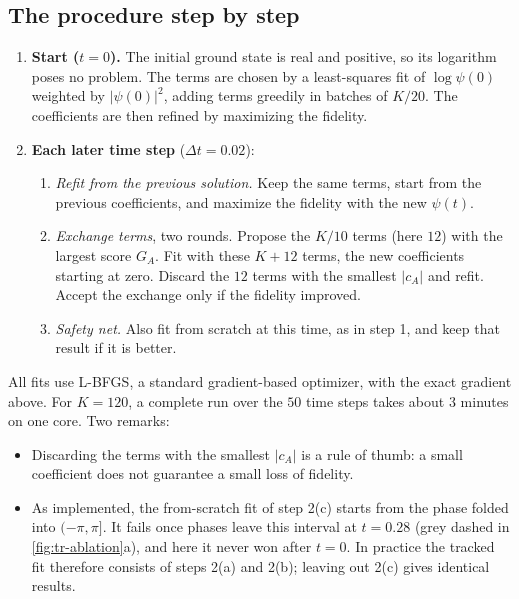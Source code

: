 \documentclass[11pt,a4paper]{article}
\begin{document}
\subsection{The procedure step by step}
\begin{enumerate}
  \item \textbf{Start ($t=0$).} The initial ground state is real and positive, so its logarithm poses no problem. The terms are chosen by a least-squares fit of $\log\psi(0)$ weighted by $|\psi(0)|^2$, adding terms greedily in batches of $K/20$. The coefficients are then refined by maximizing the fidelity.
  \item \textbf{Each later time step} ($\Delta t=0.02$):
  \begin{enumerate}
    \item \emph{Refit from the previous solution.} Keep the same terms, start from the previous coefficients, and maximize the fidelity with the new $\psi(t)$.
    \item \emph{Exchange terms}, two rounds. Propose the $K/10$ terms (here $12$) with the largest score $G_A$. Fit with these $K+12$ terms, the new coefficients starting at zero. Discard the $12$ terms with the smallest $|c_A|$ and refit. Accept the exchange only if the fidelity improved.
    \item \emph{Safety net.} Also fit from scratch at this time, as in step 1, and keep that result if it is better.
  \end{enumerate}
\end{enumerate}
All fits use L-BFGS, a standard gradient-based optimizer, with the exact gradient above. For $K=120$, a complete run over the $50$ time steps takes about $3$ minutes on one core. Two remarks:
\begin{itemize}
  \item Discarding the terms with the smallest $|c_A|$ is a rule of thumb: a small coefficient does not guarantee a small loss of fidelity.
  \item As implemented, the from-scratch fit of step 2(c) starts from the phase folded into $(-\pi,\pi]$. It fails once phases leave this interval at $t=0.28$ (grey dashed in \cref{fig:tr-ablation}a), and here it never won after $t=0$. In practice the tracked fit therefore consists of steps 2(a) and 2(b); leaving out 2(c) gives identical results.
\end{itemize}
\end{document}
